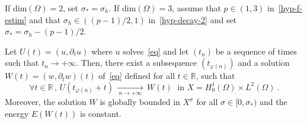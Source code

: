 \documentclass[10pt]{amsart}
\theoremstyle{definition}\newtheorem{defi}[theo]{Definition}\newtheorem{rema}[theo]{Remark}\newtheorem{exam}[theo]{Example}\newtheorem{exem}[theo]{Example}\newtheorem{nota}[theo]{Notation}
\newcommand{\RR}{\mathbb{R}}
\let\oldforall\forall
\renewcommand*{\forall}{\mathrel{\oldforall}}
\begin{document}
\begin{prop}\label{prop-asymp-compact-1}
If dim$(\Omega)=2$, set $\sigma_*=\sigma_h$. If dim$(\Omega)=3$, assume that $p\in(1,3)$ in~\eqref{hyp-f-estim} and that $\sigma_h\in ((p-1)/2,1)$ in~\eqref{hyp-decay-2} and set $\sigma_*=\sigma_h - (p-1)/2$.

Let $U(t)=(u,\partial_t u)$ where $u$ solves~\eqref{eq} and let $(t_n)$ be a sequence of times such that $t_n\rightarrow +\infty$. Then, there exist a subsequence $(t_{\varphi(n)})$ and a solution $W(t)=(w,\partial_t w)(t)$ of~\eqref{eq} defined for all $t\in\RR$, such that
\[
\forall
t\in\RR\,,\,U(t_{\varphi(n)}+t)\,\xrightarrow[\:n\longrightarrow
+\infty\;]{}\,W(t)\;\text{ in }X=H^1_0(\Omega)\times L^2(\Omega)\,.
\]
Moreover, the solution $W$ is globally bounded in $X^\sigma$ for all $\sigma\in [0,\sigma_*)$ and the energy $E(W(t))$ is constant.
\end{prop}
\end{document}
